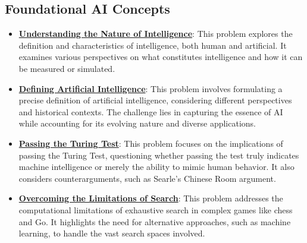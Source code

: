 \documentclass{article}%
\begin{document}
\subsection{Foundational AI Concepts}%
\label{subsec:FoundationalAIConcepts}%
\begin{itemize}[leftmargin=*]%
\item \href{https://purdue.brightspace.com/d2l/common/assets/pdfjs-d2l-dist/1.0.14-legacy/web/viewer.html?file=%2Fcontent%2Fenforced%2F1095467-wl.202510.CS.24300.001%2F02L2-Intro.pdf%3Fou%3D1095467&lang=en-us&container=d2l-fileviewer-rendered-pdf&fullscreen=d2l-fileviewer-rendered-pdf-dialog&height=667#page=5}{\textbf{Understanding the Nature of Intelligence}}: This problem explores the definition and characteristics of intelligence, both human and artificial. It examines various perspectives on what constitutes intelligence and how it can be measured or simulated.%
\item \href{https://purdue.brightspace.com/d2l/common/assets/pdfjs-d2l-dist/1.0.14-legacy/web/viewer.html?file=%2Fcontent%2Fenforced%2F1095467-wl.202510.CS.24300.001%2F02L2-Intro.pdf%3Fou%3D1095467&lang=en-us&container=d2l-fileviewer-rendered-pdf&fullscreen=d2l-fileviewer-rendered-pdf-dialog&height=667#page=5}{\textbf{Defining Artificial Intelligence}}: This problem involves formulating a precise definition of artificial intelligence, considering different perspectives and historical contexts. The challenge lies in capturing the essence of AI while accounting for its evolving nature and diverse applications.%
\item \href{https://purdue.brightspace.com/d2l/common/assets/pdfjs-d2l-dist/1.0.14-legacy/web/viewer.html?file=%2Fcontent%2Fenforced%2F1095467-wl.202510.CS.24300.001%2F02L2-Intro.pdf%3Fou%3D1095467&lang=en-us&container=d2l-fileviewer-rendered-pdf&fullscreen=d2l-fileviewer-rendered-pdf-dialog&height=667#page=6}{\textbf{Passing the Turing Test}}: This problem focuses on the implications of passing the Turing Test, questioning whether passing the test truly indicates machine intelligence or merely the ability to mimic human behavior. It also considers counterarguments, such as Searle's Chinese Room argument.%
\item \href{https://purdue.brightspace.com/d2l/common/assets/pdfjs-d2l-dist/1.0.14-legacy/web/viewer.html?file=%2Fcontent%2Fenforced%2F1095467-wl.202510.CS.24300.001%2F02L2-Intro.pdf%3Fou%3D1095467&lang=en-us&container=d2l-fileviewer-rendered-pdf&fullscreen=d2l-fileviewer-rendered-pdf-dialog&height=667#page=11}{\textbf{Overcoming the Limitations of Search}}: This problem addresses the computational limitations of exhaustive search in complex games like chess and Go. It highlights the need for alternative approaches, such as machine learning, to handle the vast search spaces involved.%

\end{itemize}
\end{document}
